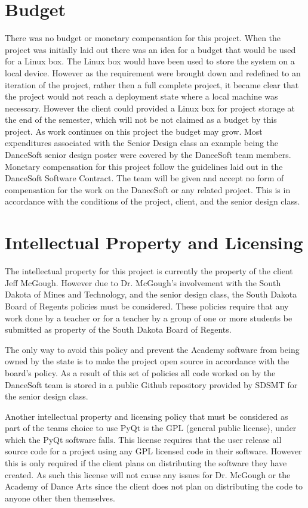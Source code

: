 \section{Budget}
There was no budget or monetary compensation for this project. When the project was initially laid out there was an idea for a budget that would be used for a Linux box. The Linux box would have been used to store the system on a local device. However as the requirement were brought down and redefined to an iteration of the project, rather then a full complete project, it became clear that the project would not reach a deployment state where a local machine was necessary. However the client could provided a Linux box for project storage at the end of the semester, which will not be not claimed as a budget by this project. As work continues on this project the budget may grow. Most expenditures associated with the Senior Design class an example being the DanceSoft senior design poster were covered by the DanceSoft team members.
Monetary compensation for this project follow the guidelines laid out in the DanceSoft Software Contract. The team will be given and accept no form of compensation for the work on the DanceSoft or any related project. This is in accordance with the conditions of the project, client, and the senior design class.

\section{Intellectual Property and Licensing}
The intellectual property for this project is currently the property of the client Jeff McGough. However due to Dr. McGough's involvement with the South Dakota of Mines and Technology, and the senior design class, the South Dakota Board of Regents policies must be considered. These policies require that any work done by a teacher or for a teacher by a group of one or more students be submitted as property of the South Dakota Board of Regents.

The only way to avoid this policy and prevent the Academy software from being owned by the state is to make the project open source in accordance with the board's policy. As a result of this set of policies all code worked on by the DanceSoft team is stored in a public Github repository provided by SDSMT for the senior design class.

Another intellectual property and licensing policy that must be considered as part of the teams choice to use PyQt is the GPL (general public license), under which the PyQt software falls. This license requires that the user release all source code for a project using any GPL licensed code in their software. However this is only required if the client plans on distributing the software they have created. As such this license will not cause any issues for Dr. McGough or the Academy of Dance Arts since the client does not plan on distributing the code to anyone other then themselves. 

